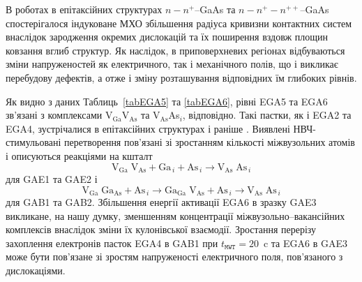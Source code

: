 В роботах \cite{Boltovets,Konakova2012FTP} в епітаксійних структурах $n-n^+$--GaAs та $n-n^+-n^{++}$--GaAs спостерігалося індуковане МХО збільшення радіуса кривизни контактних систем внаслідок зародження окремих дислокацій та їх поширення вздовж площин ковзання вглиб структур.
Як наслідок, в приповерхневих регіонах відбуваються зміни напруженостей як електричного, так і механічного полів,
що і викликає перебудову дефектів, а отже і зміну розташування відповідних їм глибоких рівнів.

Як видно з даних Таблиць~\ref{tabEGA5} та \ref{tabEGA6}, рівні EGA5 та EGA6 зв'язані з комплексами V$_\text{Ga}$V$_\text{As}$ та V$_\text{As}$As$_i$, відповідно.
Такі пастки, як і EGA2 та EGA4, зустрічалися в епітаксійних структурах і раніше \cite{Yousefi1995,Mircea1975,Bourgoin:GaAs,ASHBY:GaAs,Fang:EL6,Lefevre1977,KolFTP1989r}.
Виявлені НВЧ-стимульовані перетворення пов'язані зі зростанням кількості міжвузольних атомів і описуються
реакціями на кшталт
\begin{equation*}
  \text{V}_\text{Ga}\;\text{V}_\text{As}+\text{Ga}_{\,i}+\text{As}_{\,i} \rightarrow \text{V}_\text{As}\;\text{As}_{\,i}
\end{equation*}
для GAE1 та GAE2 і
\begin{equation*}
  \text{V}_\text{Ga}\;\text{Ga}_\text{As}+\text{As}_{\,i} \rightarrow
  \text{Ga}_\text{Ga}\;\text{V}_\text{As}+\text{As}_{\,i} \rightarrow
  \text{V}_\text{As}\;\text{As}_{\,i}
\end{equation*}
для GAB1 та GAB2.
Збільшення енергії активації EGA6 в зразку GAE3 викликане, на нашу думку, зменшенням концентрації міжвузольно--вакансійних комплексів внаслідок зміни їх кулонівської взаємодії.
Зростання перерізу захоплення електронів пасток EGA4 в GAB1 при $t_\mathtt{MWT}=20$~c та EGA6 в GAE3 може бути пов'язане зі зростям напруженості електричного поля, пов'язаного з дислокаціями.



